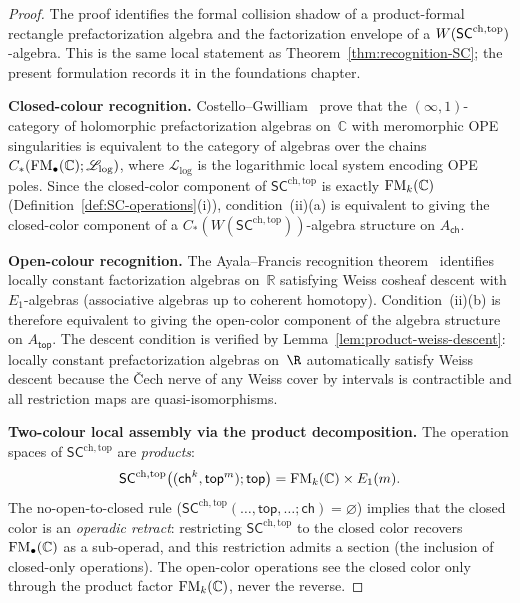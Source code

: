 \begin{proof}
The proof identifies the formal collision shadow of a product-formal
rectangle prefactorization algebra and the factorization envelope of
a $W(\mathsf{SC}^{\mathrm{ch},\mathrm{top}})$-algebra. This is the same local statement as
Theorem~\ref{thm:recognition-SC}; the present formulation records it
in the foundations chapter.

\medskip\noindent
\textbf{Closed-colour recognition.}
Costello--Gwilliam~\cite{CG17} prove that the $(\infty,1)$-category
of holomorphic prefactorization algebras on~$\mathbb C$ with
meromorphic OPE singularities is equivalent to the category of
algebras over the chains
$C_\ast(\mathrm{FM}_\bullet(\mathbb C); \mathscr{L}_{\log})$, where
$\mathscr{L}_{\log}$ is the logarithmic local system encoding OPE
poles. Since the closed-color component of
$\mathsf{SC}^{\mathrm{ch,top}}$ is exactly $\mathrm{FM}_k(\mathbb C)$
(Definition~\ref{def:SC-operations}(i)), condition~(ii)(a) is
equivalent to giving the closed-color component of a
$C_\ast(W(\mathsf{SC}^{\mathrm{ch,top}}))$-algebra structure on
$A_{\mathsf{ch}}$.

\medskip\noindent
\textbf{Open-colour recognition.}
The Ayala--Francis recognition theorem~\cite{AF15} identifies
locally constant factorization algebras on~$\mathbb R$ satisfying
Weiss cosheaf descent with
$E_1$-algebras (associative algebras up to coherent homotopy).
Condition~(ii)(b) is therefore equivalent to giving the open-color
component of the algebra structure on $A_{\mathsf{top}}$.
The descent condition is verified by
Lemma~\ref{lem:product-weiss-descent}: locally constant
prefactorization algebras on~$\R$ automatically satisfy Weiss descent
because the \v{C}ech nerve of any Weiss cover by intervals is
contractible and all restriction maps are quasi-isomorphisms.

\medskip\noindent
\textbf{Two-colour local assembly via the product decomposition.}
The operation spaces of
$\mathsf{SC}^{\mathrm{ch,top}}$ are \emph{products}:
\[
\mathsf{SC}^{\mathrm{ch,top}}
\bigl((\mathsf{ch}^k,\mathsf{top}^m);\mathsf{top}\bigr)
= \mathrm{FM}_k(\mathbb C)\times E_1(m).
\]
The no-open-to-closed rule
($\mathsf{SC}^{\mathrm{ch,top}}(\ldots,\mathsf{top},\ldots;
\mathsf{ch})=\varnothing$) implies that the closed color is an
\emph{operadic retract}: restricting
$\mathsf{SC}^{\mathrm{ch,top}}$ to the closed color recovers
$\mathrm{FM}_\bullet(\mathbb C)$ as a sub-operad, and this restriction
admits a section (the inclusion of closed-only operations). The
open-color operations see the closed color only through the product
factor $\mathrm{FM}_k(\mathbb C)$, never the reverse.


\end{proof}

